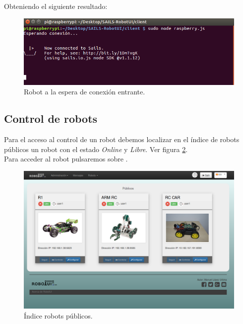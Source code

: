Obteniendo el siguiente resultado:

\begin{figure}[H]
  \begin{center}
    \includegraphics[scale=.6]{imagenes/manual-usuario/espera-conexion.png}
  \end{center}
  \caption{ Robot a la espera de conexión entrante.}
  \label{website:pagina-principal}
\end{figure}

\subsection{ Control de robots }
\label{sec:control-robot}


Para el acceso al control de un robot debemos localizar en el índice de robots públicos un robot con el estado \emph{Online} y \emph{Libre}. Ver figura \ref{website:inice-public-robots}.\\

Para acceder al robot pulsaremos sobre .\\

\begin{figure}[H]
  \begin{center}
    \includegraphics[scale=.25]{imagenes/manual-usuario/robots-publicos.png}
  \end{center}
  \caption{ Índice robots públicos.}
  \label{website:inice-public-robots}
\end{figure}

